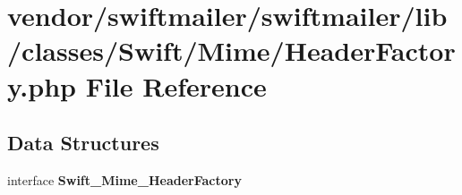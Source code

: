 \section{vendor/swiftmailer/swiftmailer/lib/classes/\+Swift/\+Mime/\+Header\+Factory.php File Reference}
\label{_header_factory_8php}
\subsection*{Data Structures}
\begin{DoxyCompactItemize}
\item 
interface {\bf Swift\+\_\+\+Mime\+\_\+\+Header\+Factory}
\end{DoxyCompactItemize}
